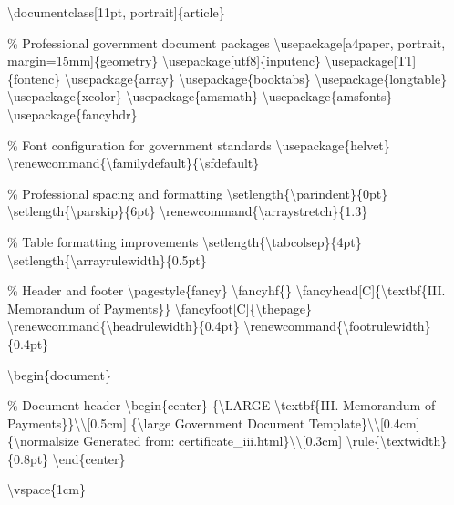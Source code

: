 \textbackslash{}documentclass[11pt, portrait]\{article\}

\% Professional government document packages
\textbackslash{}usepackage[a4paper, portrait, margin=15mm]\{geometry\}
\textbackslash{}usepackage[utf8]\{inputenc\}
\textbackslash{}usepackage[T1]\{fontenc\}
\textbackslash{}usepackage\{array\}
\textbackslash{}usepackage\{booktabs\}
\textbackslash{}usepackage\{longtable\}
\textbackslash{}usepackage\{xcolor\}
\textbackslash{}usepackage\{amsmath\}
\textbackslash{}usepackage\{amsfonts\}
\textbackslash{}usepackage\{fancyhdr\}

\% Font configuration for government standards
\textbackslash{}usepackage\{helvet\}
\textbackslash{}renewcommand\{\textbackslash{}familydefault\}\{\textbackslash{}sfdefault\}

\% Professional spacing and formatting
\textbackslash{}setlength\{\textbackslash{}parindent\}\{0pt\}
\textbackslash{}setlength\{\textbackslash{}parskip\}\{6pt\}
\textbackslash{}renewcommand\{\textbackslash{}arraystretch\}\{1.3\}

\% Table formatting improvements
\textbackslash{}setlength\{\textbackslash{}tabcolsep\}\{4pt\}
\textbackslash{}setlength\{\textbackslash{}arrayrulewidth\}\{0.5pt\}

\% Header and footer
\textbackslash{}pagestyle\{fancy\}
\textbackslash{}fancyhf\{\}
\textbackslash{}fancyhead[C]\{\textbackslash{}textbf\{III. Memorandum of Payments\}\}
\textbackslash{}fancyfoot[C]\{\textbackslash{}thepage\}
\textbackslash{}renewcommand\{\textbackslash{}headrulewidth\}\{0.4pt\}
\textbackslash{}renewcommand\{\textbackslash{}footrulewidth\}\{0.4pt\}

\textbackslash{}begin\{document\}

\% Document header
\textbackslash{}begin\{center\}
\{\textbackslash{}LARGE \textbackslash{}textbf\{III. Memorandum of Payments\}\}\textbackslash{}\textbackslash{}[0.5cm]
\{\textbackslash{}large Government Document Template\}\textbackslash{}\textbackslash{}[0.4cm]
\{\textbackslash{}normalsize Generated from: certificate\_iii.html\}\textbackslash{}\textbackslash{}[0.3cm]
\textbackslash{}rule\{\textbackslash{}textwidth\}\{0.8pt\}
\textbackslash{}end\{center\}

\textbackslash{}vspace\{1cm\}

